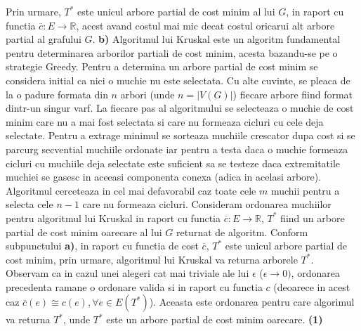 \documentclass{article}
\begin{document}
\newline
\newline
Prin urmare, $T^*$ este unicul arbore partial de cost minim al lui $G$, in raport cu functia $\overline{c}:E \rightarrow \mathbb{R}$, acest avand costul mai mic decat costul oricarui alt arbore partial al grafului $G$.
\newline
\newline
\textbf{b)} Algoritmul lui Kruskal este un algoritm fundamental pentru determinarea arborilor partiali de cost minim, acesta bazandu-se pe o strategie Greedy. Pentru a determina un arbore partial de cost minim se considera initial ca nici o muchie nu este selectata. Cu alte cuvinte, se pleaca de la o padure formata din $n$ arbori (unde $n=|V(G)|$) fiecare arbore fiind format dintr-un singur varf. La fiecare pas al algoritmului se selecteaza o muchie de cost minim care nu a mai fost selectata si care nu formeaza cicluri cu cele deja selectate. 
\newline
\newline
Pentru a extrage minimul se sorteaza muchiile crescator dupa cost si se parcurg secvential muchiile ordonate iar pentru a testa daca o muchie formeaza cicluri cu muchiile deja selectate este suficient sa se testeze daca extremitatile muchiei se gasesc in aceeasi componenta conexa (adica in acelasi arbore). Algoritmul cerceteaza in cel mai defavorabil caz toate cele $m$ muchii pentru a selecta cele $n-1$ care nu formeaza cicluri. 
\newline
\newline
Consideram ordonarea muchiilor pentru algoritmul lui Kruskal in raport cu functia $\overline{c}:E\rightarrow \mathbb{R}$,  $T^*$ fiind un arbore partial de cost minim oarecare al lui $G$ returnat de algoritm. Conform subpunctului \textbf{a)}, in raport cu functia de cost $\overline{c}$, $T^*$ este unicul arbore partial de cost minim, prin urmare, algoritmul lui Kruskal va returna arborele $T^*$. Observam ca in cazul unei alegeri cat mai triviale ale lui $\epsilon$ ($\epsilon \rightarrow 0)$, ordonarea precedenta ramane o ordonare valida si in raport cu functia $c$ (deoarece in acest caz $\overline{c}(e)\cong c(e), \forall e \in E(T^*)$). Aceasta este ordonarea pentru care algorimul va returna $T^*$, unde $T^*$ este un arbore partial de cost minim oarecare. \textbf{(1)}
\newline
\newline
\end{document}
